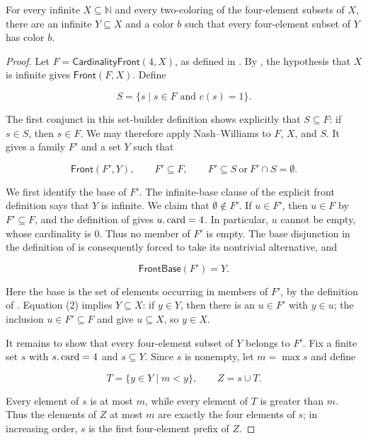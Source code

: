 \begin{lemma}
For every infinite $X\subseteq\mathbb N$ and every two-coloring of the
four-element subsets of $X$, there are an infinite $Y\subseteq X$ and a
color $b$ such that every four-element subset of $Y$ has color $b$.
\end{lemma}
\begin{proof}
Let $F=\mathsf{CardinalityFront}(4,X)$, as defined in
.  By
, the hypothesis that $X$ is infinite
gives $\mathsf{Front}(F,X)$.  Define

\[
S=\{s\mid s\in F\text{ and }c(s)=1\}.
\]

The first conjunct in this set-builder definition shows explicitly that
$S\subseteq F$: if $s\in S$, then $s\in F$.  We may therefore apply
Nash--Williams  to $F$, $X$, and $S$.  It gives a
family $F'$ and a set $Y$ such that

\[
\mathsf{Front}(F',Y),\qquad F'\subseteq F,\qquad
F'\subseteq S\ \text{or}\ F'\cap S=\emptyset.
\tag{1}
\]

We first identify the base of $F'$.  The infinite-base clause of the
explicit front definition  says that $Y$ is infinite.
We claim that $\emptyset\notin F'$.  If $u\in F'$, then
$u\in F$ by $F'\subseteq F$, and the definition of
 gives $u.\mathop{\rm card}=4$.  In
particular, $u$ cannot be empty, whose cardinality is $0$.  Thus no
member of $F'$ is empty.  The base disjunction in the definition of
 is consequently forced to take its nontrivial
alternative, and

\[
\mathsf{FrontBase}(F')=Y.
\tag{2}
\]

Here the base is the set of elements occurring in members of $F'$, by
the definition of .  Equation (2) implies
$Y\subseteq X$: if $y\in Y$, then there is an $u\in F'$ with $y\in u$;
the inclusion $u\in F'\subseteq F$ and
 give $u\subseteq X$, so $y\in X$.

It remains to show that every four-element subset of $Y$ belongs to
$F'$.  Fix a finite set $s$ with $s.\mathop{\rm card}=4$ and
$s\subseteq Y$.  Since $s$ is nonempty, let $m=\max s$ and define

\[
T=\{y\in Y\mid m<y\},\qquad Z=s\cup T.
\]

Every element of $s$ is at most $m$, while every element of $T$ is
greater than $m$.  Thus the elements of $Z$ at most $m$ are exactly the
four elements of $s$; in increasing order, $s$ is the first four-element
prefix of $Z$.


\end{proof}
